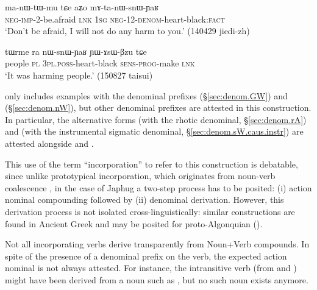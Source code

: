 \begin{exe}
\ex \label{ex:mAtnWsnWYAR}
\gll ma-nɯ-tɯ-mu tɕe aʑo  mɤ-ta-nɯ-snɯ-ɲaʁ \\
\textsc{neg}-\textsc{imp}-2-be.afraid \textsc{lnk} \textsc{1sg} \textsc{neg}-1\fl{}2-\textsc{denom}-heart-black:\textsc{fact} \\
 \glt `Don't be afraid, I will not do any harm to you.' (140429 jiedi-zh)
\end{exe}

\begin{exe}
\ex \label{ex:nWsnWYaR}
\gll   tɯrme ra nɯ-snɯ-ɲaʁ ɲɯ-ɤsɯ-βzu tɕe \\
people \textsc{pl} \textsc{3pl}.\textsc{poss}-heart-black \textsc{sens}-\textsc{prog}-make \textsc{lnk} \\
 \glt `It was harming people.' (150827 taisui)
 \end{exe}  
  
 only includes examples with the denominal prefixes  (§\ref{sec:denom.GW}) and  (§\ref{sec:denom.nW}), but other denominal prefixes are attested in this construction. In particular, the alternative forms  (with the rhotic denominal, §\ref{sec:denom.rA}) and   (with the instrumental sigmatic denominal, §\ref{sec:denom.sW.caus.instr}) are attested alongside   and .
 
This use of the term ``incorporation'' to refer to this construction is debatable, since unlike prototypical incorporation, which originates from noun-verb coalescence \citep{mithun84incorp}, in the case of Japhug a two-step process has to be posited: (i) action nominal compounding followed by (ii) denominal derivation. However, this derivation process is not isolated cross-linguistically: similar constructions are found in Ancient Greek \citep{benveniste66incorp} and may be posited for proto-Algonquian (\citealt{garrett04stem.structure,jacques12incorp}). 
 
Not all incorporating verbs derive transparently from Noun+Verb compounds. In spite of the presence of a denominal prefix on the verb, the expected action nominal is not always attested. For instance, the intransitive verb  (from   and  ) might have been derived from a noun such as , but no such noun exists anymore.


